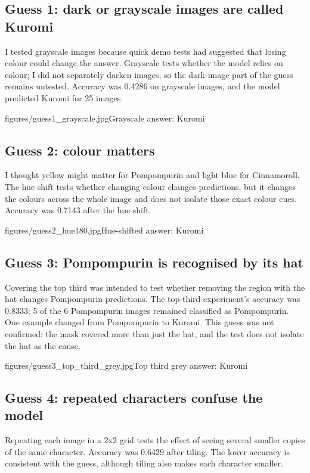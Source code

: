 \documentclass[11pt]{article}
\begin{document}
\subsection*{Guess 1: dark or grayscale images are called Kuromi}
I tested grayscale images because quick demo tests had suggested that losing
colour could change the answer. Grayscale tests whether the model relies on
colour; I did not separately darken images, so the dark-image part of the
guess remains untested. Accuracy was 0.4286 on grayscale images, and the model
predicted Kuromi for 25 images.

           {figures/guess1_grayscale.jpg}{Grayscale answer: Kuromi}

\subsection*{Guess 2: colour matters}
I thought yellow might matter for Pompompurin and light blue for Cinnamoroll.
The hue shift tests whether changing colour changes predictions, but it
changes the colours across the whole image and does not isolate those exact
colour cues. Accuracy was 0.7143 after the hue shift.

           {figures/guess2_hue180.jpg}{Hue-shifted answer: Kuromi}

\subsection*{Guess 3: Pompompurin is recognised by its hat}
Covering the top third was intended to test whether removing the region with
the hat changes Pompompurin predictions. The top-third experiment's accuracy
was 0.8333: 5 of the 6 Pompompurin images remained classified as Pompompurin.
One example changed from Pompompurin to Kuromi. This guess was not confirmed:
the mask covered more than just the hat, and the test does not isolate the hat
as the cause.

           {figures/guess3_top_third_grey.jpg}{Top third grey answer: Kuromi}

\subsection*{Guess 4: repeated characters confuse the model}
Repeating each image in a 2x2 grid tests the effect of seeing several smaller
copies of the same character. Accuracy was 0.6429 after tiling. The lower
accuracy is consistent with the guess, although tiling also makes each
character smaller.
\end{document}
